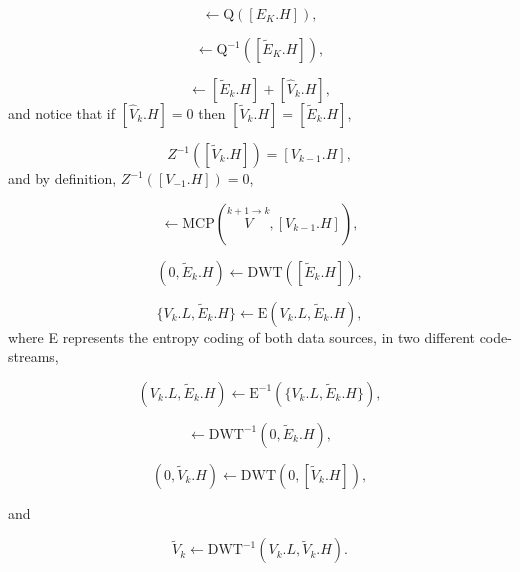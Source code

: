 \begin{equation}
  [\tilde{E}_k.H] \leftarrow \text{Q}([E_K.H]),
  \tag{j}
\end{equation}

\begin{equation}
  [\tilde{E}_k.H] \leftarrow  \text{Q}^{-1}([\tilde{E}_K.H]),
  \tag{k}
\end{equation}

\begin{equation}
  [\tilde{V}_k.H] \leftarrow [\tilde{E}_k.H] + [\hat{V}_k.H],
  \tag{l}
\end{equation}
and notice that if $[\hat{V}_k.H]=0$ then $[\tilde{V}_k.H] =
[\tilde{E}_k.H]$,

\begin{equation}
  Z^{-1}([\tilde{V}_k.H]) = [V_{k-1}.H],
  \tag{m}
\end{equation}
and by definition, $Z^{-1}([V_{-1}.H]) = 0$,

\begin{equation}
  [\hat{V}_k.H] \leftarrow \text{MCP}(\overset{k+1\rightarrow k}{V}, [V_{k-1}.H]),
  \tag{n}
\end{equation}

\begin{equation}
  (0, \tilde{E}_k.H) \leftarrow \text{DWT}([\tilde{E}_k.H]),
  \tag{o}
\end{equation}

\begin{equation}
  \{V_k.L, \tilde{E}_k.H\} \leftarrow \text{E}(V_k.L, \tilde{E}_k.H),
  \tag{p}
\end{equation}
where E represents the entropy coding of both data sources, in two
different code-streams,

\begin{equation}
  (V_k.L, \tilde{E}_k.H) \leftarrow \text{E}^{-1}(\{V_k.L, \tilde{E}_k.H\}),
  \tag{q}
\end{equation}

\begin{equation}
  [\tilde{E}_k.H] \leftarrow \text{DWT}^{-1}(0, \tilde{E}_k.H),
  \tag{r}
\end{equation}

\begin{equation}
  (0, \tilde{V}_k.H) \leftarrow \text{DWT}(0, [\tilde{V}_k.H]),
  \tag{s}
\end{equation}

and

\begin{equation}
  \tilde{V}_k \leftarrow \text{DWT}^{-1}(V_k.L, \tilde{V}_k.H).
  \tag{t}
\end{equation}

